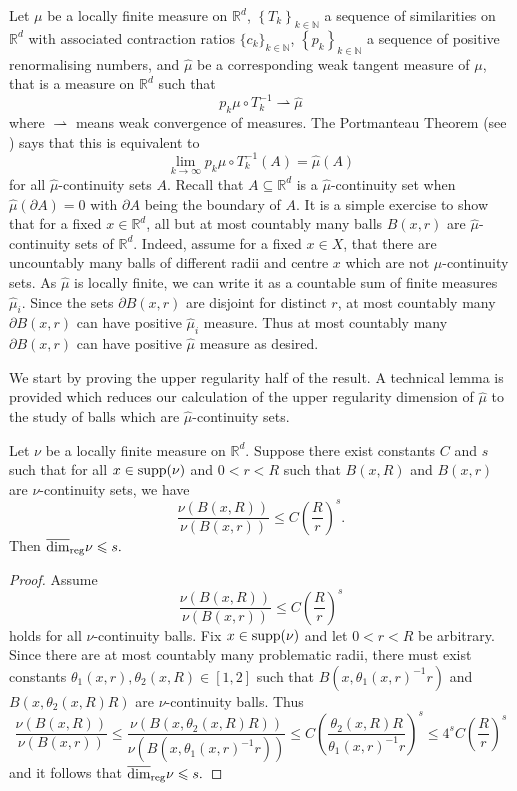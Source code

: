 Let $\mu$ be a locally finite measure on $\mathbb{R}^d$, $\left\{T_k\right\}_{k\in \mathbb{N}}$ a sequence of similarities on $\mathbb{R}^d$ with associated contraction ratios $\{c_k\}_{k\in \mathbb{N}}$, $\left\{p_k\right\}_{k\in \mathbb{N}}$ a sequence of positive renormalising numbers, and $\hat{\mu}$ be a corresponding weak tangent measure of $\mu$, that is a measure on $\mathbb{R}^d$ such that 
\[
p_k \mu \circ T^{-1}_k \rightharpoonup \hat{\mu}
\]
where $\rightharpoonup$ means weak convergence of measures. The Portmanteau Theorem (see \cite[Theorem 1.24]{mattila}) says that this is equivalent to 
\[
\lim_{k\rightarrow \infty} p_k \mu \circ T^{-1}_k (A) =\hat{\mu}(A)
\]
for all $\hat{\mu}$-continuity sets $A$. Recall that  $A\subseteq \mathbb{R}^d$ is a $\hat{\mu}$-continuity set when $\hat{\mu}(\partial A) = 0$ with $\partial A$ being the boundary of $A$. It is a simple exercise to show that for a fixed $x \in \mathbb{R}^d$, all but at most countably many balls $B(x,r)$ are $\hat{\mu}$-continuity sets of $\mathbb{R}^d$. Indeed, assume for a fixed $x \in X$, that there are uncountably many balls of different radii and centre $x$ which are not $\hat{\mu}$-continuity sets. As $\hat{\mu}$ is locally finite, we can write it as a countable sum of finite measures $\hat{\mu}_i$. Since the sets $\partial B(x,r)$ are disjoint for distinct $r$, at most countably many $\partial B(x,r)$ can have positive $\hat{\mu}_i$ measure. Thus at most countably many $\partial B(x,r)$ can have positive $\hat{\mu}$ measure as desired.


We start by proving the upper regularity half of the result. A technical lemma is provided which reduces our calculation of the upper regularity dimension of $\hat \mu$ to the study of balls which are $\hat{\mu}$-continuity sets.

\begin{lemma}\label{ch-upper-reg:nu-cont-upper-dim}
	Let $\nu$ be a locally finite measure  on $ \mathbb{R}^d$. Suppose there exist constants $C$ and $s$ such that for all $x\in \textup{supp}(\nu)$ and $0<r<R$ such that $B(x,R)$ and $B(x,r)$ are $\nu$-continuity sets, we have
	\[
	\frac{\nu(B(x,R))}{\nu(B(x,r))} \leq C\left(\frac{R}{r}\right)^{s}.
	\]
	Then $\overline{\dim}_{\textup{reg}}  \nu \le s.$
\end{lemma}

\begin{proof}
	Assume 
	\[
	\frac{\nu(B(x,R))}{\nu(B(x,r))} \leq C\left(\frac{R}{r}\right)^{s}
	\]
	holds for all $\nu$-continuity balls. Fix $x  \in \textup{supp}(\nu)$ and let $0<r<R$ be arbitrary. Since there are at most countably many problematic radii, there must exist constants $\theta_1(x,r),\theta_2(x,R)\in[1,2]$ such that $B(x,\theta_1(x,r)^{-1}r)$ and $B(x,\theta_2(x,R) R)$ are $\nu$-continuity balls. Thus
	\[
	\frac{\nu(B(x,R))}{\nu(B(x,r))} \leq \frac{\nu(B(x,\theta_2(x,R)R))}{\nu(B(x,\theta_1(x,r)^{-1}r))} \le   C\left(\frac{\theta_2(x,R)R}{\theta_1(x,r)^{-1}r}\right)^{s} \le 4^s C \left(\frac{R}{r}\right)^{s}
	\]
	and it follows that $\overline{\dim}_{\textup{reg}}  \nu \le s.$
\end{proof}

